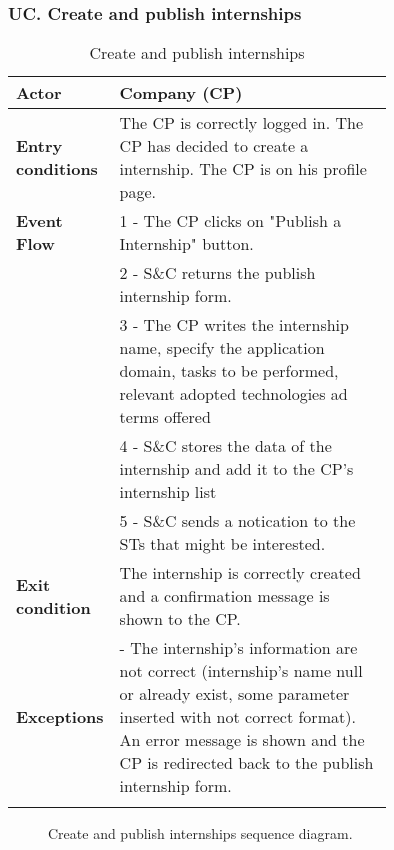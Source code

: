 \subsubsection*{UC\cuc . Create and publish internships}
\begin{center}
    \begin{longtable}{|l|p{0.75\linewidth}|}
        \hline
        \textbf{Actor}            & Company (CP)\\
        \hline
        \textbf{Entry conditions} & The CP is correctly logged in. The CP has decided to create a internship. The CP is on his profile page. \\
        \hline
        \textbf{Event Flow}     & 1 - The CP clicks on "Publish a Internship"                                button.\\
                                & 2 - S\&C returns the publish internship form.\\
                                & 3 - The CP writes the internship name, specify the application domain, tasks to be performed, relevant adopted technologies ad terms offered\\
                                & 4 - S\&C stores the data of the internship and add it to the CP's internship list\\
                                & 5 - S\&C sends a notication to the STs that might be interested.\\
        \hline
        \textbf{Exit condition}   & The internship is correctly created and a confirmation message is shown to the CP. \\       
        \hline
        \textbf{Exceptions}       & - The internship's information are not                                  correct (internship's name null or already                                exist, some parameter inserted with not correct                           format). An error message is shown and the CP                             is redirected back to the publish internship                              form.\\
        \hline
        \caption{Create and publish internships}
        \label{tab: create_and_publish_internships_usecase}
    \end{longtable}
\end{center}

\begin{figure}[H]
    \begin{center}
        
        \caption{Create and publish internships sequence diagram.}
        \label{fig:create_internship_seqd}%
    \end{center}
\end{figure}

